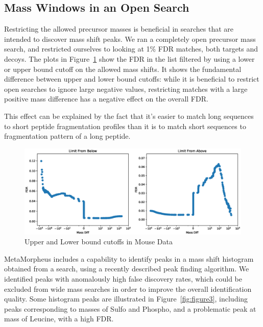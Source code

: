 \documentclass[journal=jprobs,manuscript=article]{achemso}
\begin{document}
\subsection{Mass Windows in an Open Search}

Restricting the allowed precursor masses is beneficial in searches that are intended to discover mass shift peaks.
We ran a completely open precursor mass search, and restricted ourselves to looking at 1\% FDR matches, both targets and decoys.
The plots in Figure~\ref{fig:figure2-upperlowerbounds} show the FDR in the list filtered by using a lower or upper bound cutoff on the allowed mass shifts.
It shows the fundamental difference between upper and lower bound cutoffs: while it is beneficial to restrict open searches to ignore large negative values, restricting matches with a large positive mass difference has a negative effect on the overall FDR.

This effect can be explained by the fact that it's easier to match long sequences to short peptide fragmentation profiles than it is to match short sequences to fragmentation pattern of a long peptide.

\begin{figure}
\caption{Upper and Lower bound cutoffs in Mouse Data}
\label{fig:figure2-upperlowerbounds}
\includegraphics[scale=0.5]{figure_2-upperlowerbounds}
\end{figure}


MetaMorpheus includes a capability to identify peaks in a mass shift histogram obtained from a search, using a recently described peak finding algorithm\cite{Rodriguez_2014}.
We identified peaks with anomalously high false discovery rates, which could be excluded from wide mass searches in order to improve the overall identification quality.
Some histogram peaks are illustrated in Figure~\ref{fig:figure3}, including peaks corresponding to masses of Sulfo and Phospho, and a problematic peak at mass of Leucine, with a high FDR.
\end{document}
